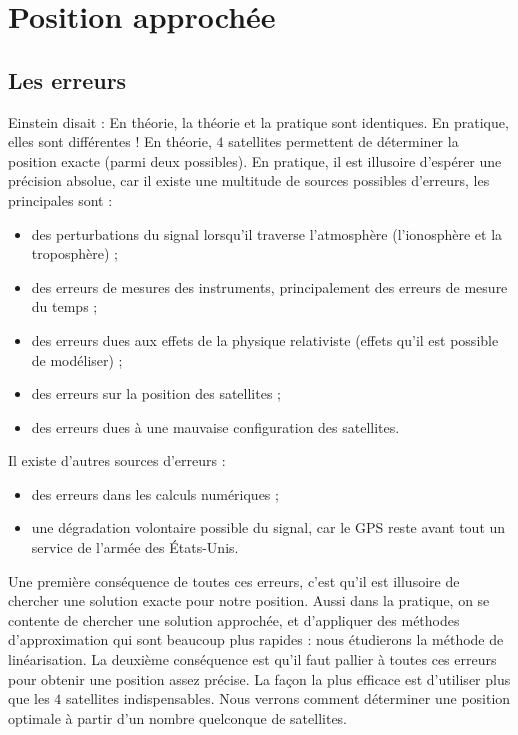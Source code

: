 \documentclass[class=report,crop=false]{standalone}
\begin{document}
\section{Position approchée}

\subsection{Les erreurs}

Einstein disait : \og En théorie, la théorie et la pratique sont identiques.
En pratique, elles sont différentes !\fg{} 
En théorie, $4$ satellites permettent de déterminer la position exacte (parmi deux possibles).
En pratique, il est illusoire d'espérer une précision absolue, car 
il existe une multitude de sources possibles d'erreurs, les principales sont  :
\begin{itemize}
  \item des perturbations du signal lorsqu'il traverse l'atmosphère
  (l'ionosphère et la troposphère) ; 
  
  \item des erreurs de mesures des instruments, principalement 
  des erreurs de mesure du temps ; 
  
  \item des erreurs dues aux effets de la physique relativiste (effets qu'il est possible de modéliser) ;  
  
  \item des erreurs sur la position des satellites ;
  
  \item des erreurs dues à une mauvaise configuration des satellites.
\end{itemize}

Il existe d'autres sources d'erreurs  :
\begin{itemize}
  \item des erreurs dans les calculs numériques ;
  \item une dégradation volontaire possible du signal, car le GPS reste avant tout
  un service de l'armée des \'Etats-Unis.
\end{itemize}

Une première conséquence de toutes ces erreurs, c'est qu'il est illusoire de
chercher une solution exacte pour notre position. Aussi dans la pratique, on
se contente de chercher une solution approchée, et d'appliquer des méthodes
d'approximation qui sont beaucoup plus rapides : nous étudierons 
la méthode de linéarisation.
La deuxième conséquence est qu'il faut pallier à toutes ces erreurs pour 
obtenir une position assez précise. La façon la plus efficace est d'utiliser plus  
que les $4$ satellites indispensables. Nous verrons comment déterminer
une position optimale à partir d'un nombre quelconque de satellites.
\end{document}
